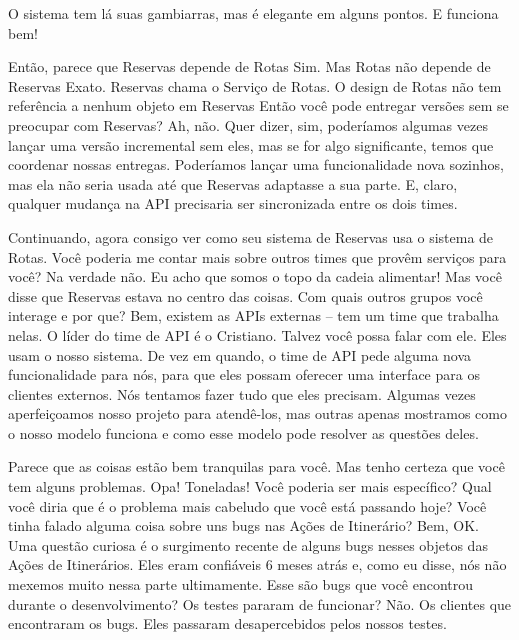 \documentclass[12pt,play]{article}
\begin{document}
O sistema tem lá suas gambiarras, mas é elegante em alguns pontos. E funciona bem!

\narr
{}

\scene
\serg Então, parece que Reservas depende de Rotas
\alexrobe Sim.
\serg Mas Rotas não depende de Reservas
\robe Exato. Reservas chama o Serviço de Rotas. O design de Rotas não tem referência a nenhum objeto em Reservas
\serg Então você pode entregar versões sem se preocupar com Reservas?
\robe Ah, não. Quer dizer, sim, poderíamos algumas vezes lançar uma versão incremental sem eles, mas se for algo significante, temos que coordenar nossas entregas. Poderíamos lançar uma funcionalidade nova sozinhos, mas ela não seria usada até que Reservas adaptasse a sua parte.
\alex E, claro, qualquer mudança na API precisaria ser sincronizada entre os dois times.

\scene
\serg Continuando, agora consigo ver como seu sistema de Reservas usa o sistema de Rotas. Você poderia me contar mais sobre outros times que provêm serviços para você?
\alex Na verdade não. Eu acho que somos o topo da cadeia alimentar!
\serg Mas você disse que Reservas estava no centro das coisas. Com quais outros grupos você interage e por que?
\alex Bem, existem as APIs externas -- tem um time que trabalha nelas. O líder do time de API é o Cristiano. Talvez você possa falar com ele. Eles usam o nosso sistema. De vez em quando, o time de API pede alguma nova funcionalidade para nós, para que eles possam oferecer uma interface para os clientes externos. Nós tentamos fazer tudo que eles precisam. Algumas vezes aperfeiçoamos nosso projeto para atendê-los, mas outras apenas mostramos como o nosso modelo funciona e como esse modelo pode resolver as questões deles.

\narr {}
\scene
\serg Parece que as coisas estão bem tranquilas para você. Mas tenho certeza que você tem alguns problemas.
\alex Opa! Toneladas! Você poderia ser mais específico?
\serg Qual você diria que é o problema mais cabeludo que você está passando hoje?
\robe Você tinha falado alguma coisa sobre uns bugs nas Ações de Itinerário?
\alex Bem, OK. Uma questão curiosa é o surgimento recente de alguns bugs nesses objetos das Ações de Itinerários. Eles eram confiáveis 6 meses atrás e, como eu disse, nós não mexemos muito nessa parte ultimamente.
\serg Esse são bugs que você encontrou durante o desenvolvimento? Os testes pararam de funcionar?
\alex {} Não. Os clientes que encontraram os bugs. Eles passaram desapercebidos pelos nossos testes. 
\end{document}
